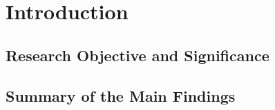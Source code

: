 \chapter{Introduction}\label{ch:Introduction}


\section{Research Objective and Significance}\label{sec:Research_Objective_and_Significance}


\section{Summary of the Main Findings}\label{sec:Summary_of_the_Main_Findings}


